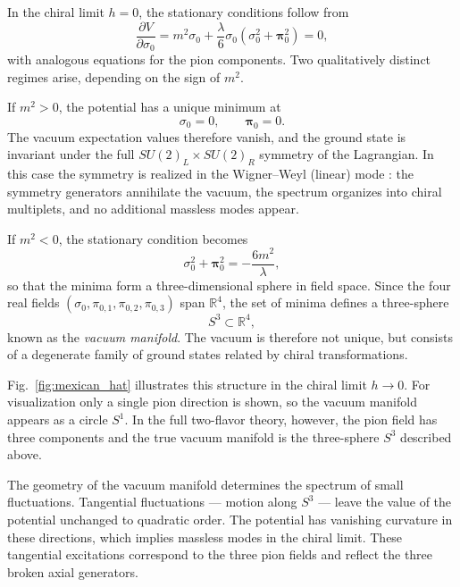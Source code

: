 In the chiral limit $h=0$, the stationary conditions follow from
\begin{equation}
\frac{\partial V}{\partial \sigma_0}
= m^2 \sigma_0 + \frac{\lambda}{6}\sigma_0(\sigma_0^2 + \boldsymbol{\pi}_0^2)
= 0 ,
\end{equation}
with analogous equations for the pion components. Two qualitatively
distinct regimes arise, depending on the sign of $m^2$.

If $m^2>0$, the potential has a unique minimum at
\begin{equation}
\sigma_0 = 0, \qquad \boldsymbol{\pi}_0=0 .
\end{equation}
The vacuum expectation values therefore vanish, and the ground state
is invariant under the full $SU(2)_L \times SU(2)_R$ symmetry of the
Lagrangian. In this case the symmetry is realized in the
Wigner--Weyl (linear) mode \cite{WeinbergQFT}: the symmetry generators
annihilate the vacuum, the spectrum organizes into chiral multiplets,
and no additional massless modes appear.

If $m^2<0$, the stationary condition becomes
\begin{equation}
\sigma_0^2 + \boldsymbol{\pi}_0^2
= -\frac{6m^2}{\lambda},
\end{equation}
so that the minima form a three-dimensional sphere in field space.
Since the four real fields
$(\sigma_0,\pi_{0,1},\pi_{0,2},\pi_{0,3})$ span $\mathbb{R}^4$,
the set of minima defines a three-sphere
\begin{equation}
S^3 \subset \mathbb{R}^4 ,
\end{equation}
known as the \emph{vacuum manifold}. The vacuum is therefore not
unique, but consists of a degenerate family of ground states related
by chiral transformations.

Fig.~\ref{fig:mexican_hat} illustrates this structure in the chiral
limit $h \to 0$. For visualization only a single pion direction is
shown, so the vacuum manifold appears as a circle $S^1$. In the full
two-flavor theory, however, the pion field has three components and
the true vacuum manifold is the three-sphere $S^3$ described above.

The geometry of the vacuum manifold determines the spectrum of small
fluctuations. Tangential fluctuations — motion along $S^3$ — leave the
value of the potential unchanged to quadratic order. The potential has
vanishing curvature in these directions, which implies massless modes
in the chiral limit. These tangential excitations correspond to the
three pion fields and reflect the three broken axial generators.

